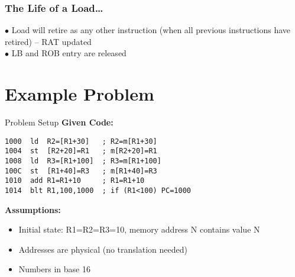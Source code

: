 \documentclass[aspectratio=169,12pt]{beamer}
\begin{document}
\begin{frame}
\frametitle{The Life of a Load\ldots}
\begin{center}
\LoadLifecycleDiagram[
    iq1={R3$\leftarrow$MEM(R2+50)},
    lbV={1},
    lbAddr={V(R2+50)},
    lbBC={0},
    arrows=0
]
\end{center}
\vspace{-3mm}
\scriptsize
$\bullet$ Load will retire as any other instruction (when all previous instructions have retired) -- RAT updated\\
$\bullet$ LB and ROB entry are released
\end{frame}

\section{Example Problem}

\begin{frame}[fragile]{Problem Setup}
\textbf{Given Code:}
\begin{lstlisting}[basicstyle=\footnotesize\ttfamily]
1000  ld  R2=[R1+30]   ; R2=m[R1+30]
1004  st  [R2+20]=R1   ; m[R2+20]=R1
1008  ld  R3=[R1+100]  ; R3=m[R1+100]
100C  st  [R1+40]=R3   ; m[R1+40]=R3
1010  add R1=R1+10     ; R1=R1+10
1014  blt R1,100,1000  ; if (R1<100) PC=1000
\end{lstlisting}

\textbf{Assumptions:}
\begin{itemize}
    \item Initial state: R1=R2=R3=10, memory address N contains value N
    \item Addresses are physical (no translation needed)
    \item Numbers in base 16
\end{itemize}
\end{frame}
\end{document}
